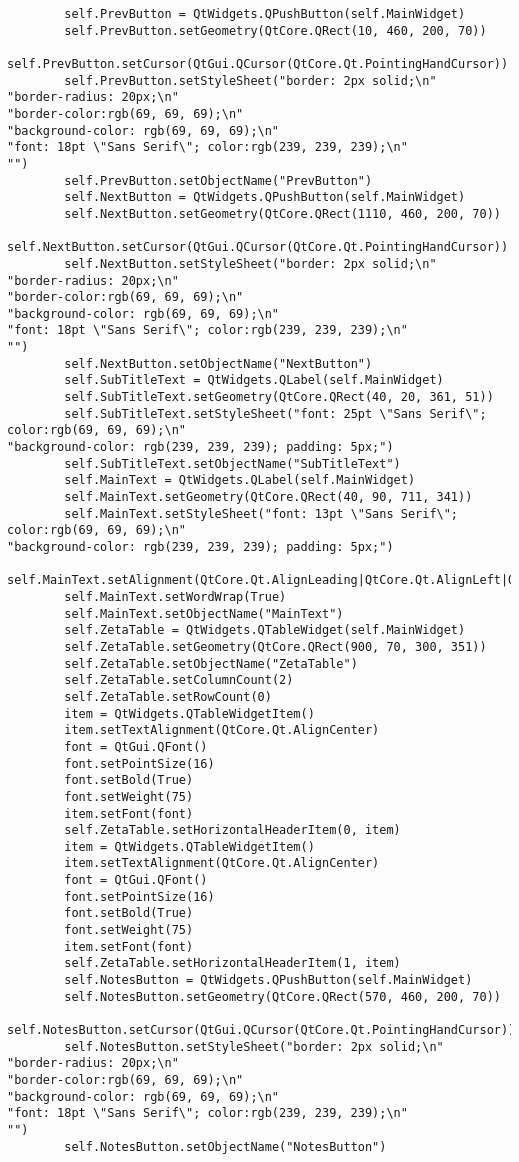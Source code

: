\documentclass{article}
\begin{document}
\begin{lstlisting}
        self.PrevButton = QtWidgets.QPushButton(self.MainWidget)
        self.PrevButton.setGeometry(QtCore.QRect(10, 460, 200, 70))
        self.PrevButton.setCursor(QtGui.QCursor(QtCore.Qt.PointingHandCursor))
        self.PrevButton.setStyleSheet("border: 2px solid;\n"
"border-radius: 20px;\n"
"border-color:rgb(69, 69, 69);\n"
"background-color: rgb(69, 69, 69);\n"
"font: 18pt \"Sans Serif\"; color:rgb(239, 239, 239);\n"
"")
        self.PrevButton.setObjectName("PrevButton")
        self.NextButton = QtWidgets.QPushButton(self.MainWidget)
        self.NextButton.setGeometry(QtCore.QRect(1110, 460, 200, 70))
        self.NextButton.setCursor(QtGui.QCursor(QtCore.Qt.PointingHandCursor))
        self.NextButton.setStyleSheet("border: 2px solid;\n"
"border-radius: 20px;\n"
"border-color:rgb(69, 69, 69);\n"
"background-color: rgb(69, 69, 69);\n"
"font: 18pt \"Sans Serif\"; color:rgb(239, 239, 239);\n"
"")
        self.NextButton.setObjectName("NextButton")
        self.SubTitleText = QtWidgets.QLabel(self.MainWidget)
        self.SubTitleText.setGeometry(QtCore.QRect(40, 20, 361, 51))
        self.SubTitleText.setStyleSheet("font: 25pt \"Sans Serif\"; color:rgb(69, 69, 69);\n"
"background-color: rgb(239, 239, 239); padding: 5px;")
        self.SubTitleText.setObjectName("SubTitleText")
        self.MainText = QtWidgets.QLabel(self.MainWidget)
        self.MainText.setGeometry(QtCore.QRect(40, 90, 711, 341))
        self.MainText.setStyleSheet("font: 13pt \"Sans Serif\"; color:rgb(69, 69, 69);\n"
"background-color: rgb(239, 239, 239); padding: 5px;")
        self.MainText.setAlignment(QtCore.Qt.AlignLeading|QtCore.Qt.AlignLeft|QtCore.Qt.AlignTop)
        self.MainText.setWordWrap(True)
        self.MainText.setObjectName("MainText")
        self.ZetaTable = QtWidgets.QTableWidget(self.MainWidget)
        self.ZetaTable.setGeometry(QtCore.QRect(900, 70, 300, 351))
        self.ZetaTable.setObjectName("ZetaTable")
        self.ZetaTable.setColumnCount(2)
        self.ZetaTable.setRowCount(0)
        item = QtWidgets.QTableWidgetItem()
        item.setTextAlignment(QtCore.Qt.AlignCenter)
        font = QtGui.QFont()
        font.setPointSize(16)
        font.setBold(True)
        font.setWeight(75)
        item.setFont(font)
        self.ZetaTable.setHorizontalHeaderItem(0, item)
        item = QtWidgets.QTableWidgetItem()
        item.setTextAlignment(QtCore.Qt.AlignCenter)
        font = QtGui.QFont()
        font.setPointSize(16)
        font.setBold(True)
        font.setWeight(75)
        item.setFont(font)
        self.ZetaTable.setHorizontalHeaderItem(1, item)
        self.NotesButton = QtWidgets.QPushButton(self.MainWidget)
        self.NotesButton.setGeometry(QtCore.QRect(570, 460, 200, 70))
        self.NotesButton.setCursor(QtGui.QCursor(QtCore.Qt.PointingHandCursor))
        self.NotesButton.setStyleSheet("border: 2px solid;\n"
"border-radius: 20px;\n"
"border-color:rgb(69, 69, 69);\n"
"background-color: rgb(69, 69, 69);\n"
"font: 18pt \"Sans Serif\"; color:rgb(239, 239, 239);\n"
"")
        self.NotesButton.setObjectName("NotesButton")


\end{lstlisting}
\end{document}
